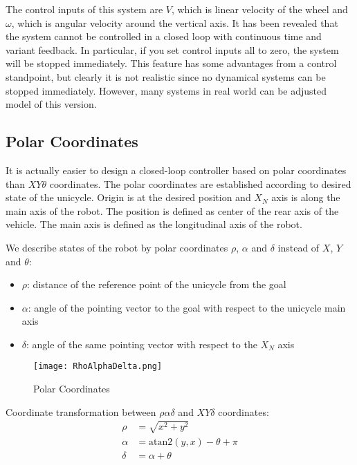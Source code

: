 \documentclass[twoside]{article}
\begin{document}
The control inputs of this system are $V$, which is linear velocity of the wheel and $\omega$, which is angular velocity around the vertical axis. It has been revealed that the system cannot be controlled in a closed loop with continuous time and variant feedback. In particular, if you set control inputs all to zero, the system will be stopped immediately. This feature has some advantages from a control standpoint, but clearly it is not realistic since no dynamical systems can be stopped immediately. However, many systems in real world can be adjusted model of this version.

\subsection{Polar Coordinates}
It is actually easier to design a closed-loop controller based on polar coordinates than $XY\theta$ coordinates. The polar coordinates are established according to desired state of the unicycle. Origin is at the desired position and $X_N$ axis is along the main axis of the robot. The position is defined as center of the rear axis of the vehicle. The main axis is defined as the longitudinal axis of the robot.

We describe states of the robot by polar coordinates $\rho$, $\alpha$ and $\delta$ instead of $X$, $Y$ and $\theta$:
\begin{itemize}
  \item $\rho$: distance of the reference point of the unicycle from the goal
  \item $\alpha$: angle of the pointing vector to the goal with respect to the unicycle main axis
  \item $\delta$: angle of the same pointing vector with respect to the $X_N$ axis
\end{itemize}

\begin{figure}[h]
\centering
\texttt{[image: RhoAlphaDelta.png]}
\caption{Polar Coordinates}
\label{RhoAlphaDeltaFigure}
\end{figure}

Coordinate transformation between $\rho\alpha\delta$ and $XY\delta$ coordinates:
\begin{equation} \label{coordinate transformation}
\begin{split}
\rho &= \sqrt{x^2+y^2} \\
\alpha &= \mathrm{atan2}(y, x) - \theta + \pi \\
\delta &= \alpha + \theta \\
\end{split}
\end{equation}
\end{document}

